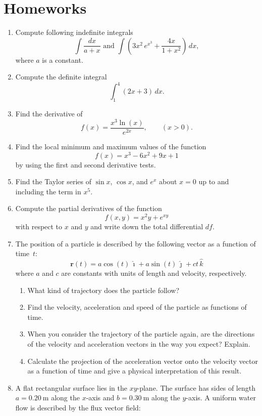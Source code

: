 \documentclass[../main.tex]{subfiles}
\begin{document}
\section{Homeworks}
\begin{enumerate}
    \item Compute following indefinite integrals
          \[
            \int \frac{dx}{a+x} \text{ and } \int \left(3x^2 \, e^{x^3} + \frac{4x}{1 + x^2}\right)\,dx,
          \]
          where \(a\) is a constant.

    \item Compute the definite integral
         \[
           \int_{1}^{4} (2x + 3)\,dx.
         \]
    
    \item Find the derivative of
          \[
            f(x) = \frac{x^3 \ln(x)}{e^{2x}}, \qquad (x>0).
          \]
    
    \item  Find the local minimum and maximum values of the function
           \[
             f(x) = x^3 - 6x^2 + 9x + 1
           \]
           by using the first and second derivative tests. 
    
    \item Find the Taylor series of $\sin x$, $\cos x$, and $e^x$ about $x=0$ up to and including the term in $x^5$.

    \item Compute the partial derivatives of the function
      \[
        f(x, y) = x^2 y + e^{xy}
      \]
      with respect to \(x\) and \(y\) and write down the total differential \(df\).
    
    \item The position of a particle is described by the following vector as a function of time~\(t\):
          \[
        \mathbf{r}(t) = a\cos(t)\,\hat{\imath} + a\sin(t)\,\hat{\jmath} + ct\,\hat{k} 
          \]
          where \(a\) and \(c\) are constants with units of length and velocity, respectively.
          \begin{enumerate}
            \item What kind of trajectory does the particle follow?
            \item Find the velocity, acceleration and speed of the particle as functions of time. 
            \item When you consider the trajectory of the particle again, are the directions of the velocity and acceleration vectors in the way you expect? Explain.
            \item Calculate the projection of the acceleration vector onto the velocity vector as a function of time and give a physical interpretation of this result.
          \end{enumerate}
    \newpage
    \item A flat rectangular surface lies in the $xy$-plane. The surface has sides of length $a = 0.20~\mathrm{m}$ along the $x$-axis and $b = 0.30~\mathrm{m}$ along the $y$-axis. A uniform water flow is described by the flux vector field:


\end{enumerate}
\end{document}
